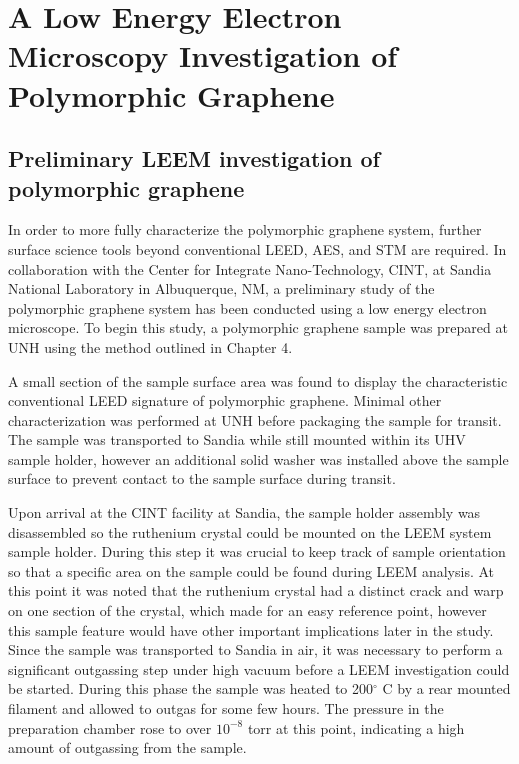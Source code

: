\chapter{\sc A Low Energy Electron Microscopy Investigation of Polymorphic Graphene}
\label{ch:A Low Energy Electron Microscopy Investigation of Polymorphic Graphene}

\section{Preliminary LEEM investigation of polymorphic graphene}
In order to more fully characterize the polymorphic graphene system, further surface science tools beyond conventional LEED, AES, and STM are required. In collaboration with the Center for Integrate Nano-Technology, CINT, at Sandia National Laboratory in Albuquerque, NM, a preliminary study of the polymorphic graphene system has been conducted using a low energy electron microscope. To begin this study, a polymorphic graphene sample was prepared at UNH using the method outlined in Chapter 4.

A small section of the sample surface area was found to display the characteristic conventional LEED signature of polymorphic graphene. Minimal other characterization was performed at UNH before packaging the sample for transit. The sample was transported to Sandia while still mounted within its UHV sample holder, however an additional solid washer was installed above the sample surface to prevent contact to the sample surface during transit.

Upon arrival at the CINT facility at Sandia, the sample holder assembly was disassembled so the ruthenium crystal could be mounted on the LEEM system sample holder. During this step it was crucial to keep track of sample orientation so that a specific area on the sample could be found during LEEM analysis. At this point it was noted that the ruthenium crystal had a distinct crack and warp on one section of the crystal, which made for an easy reference point, however this sample feature would have other important implications later in the study. Since the sample was transported to Sandia in air, it was necessary to perform a significant outgassing step under high vacuum before a LEEM investigation could be started. During this phase the sample was heated to 200$^{\circ}$ C by a rear mounted filament and allowed to outgas for some few hours. The pressure in the preparation chamber rose to over $10^{-8}$ torr at this point, indicating a high amount of outgassing from the sample.

